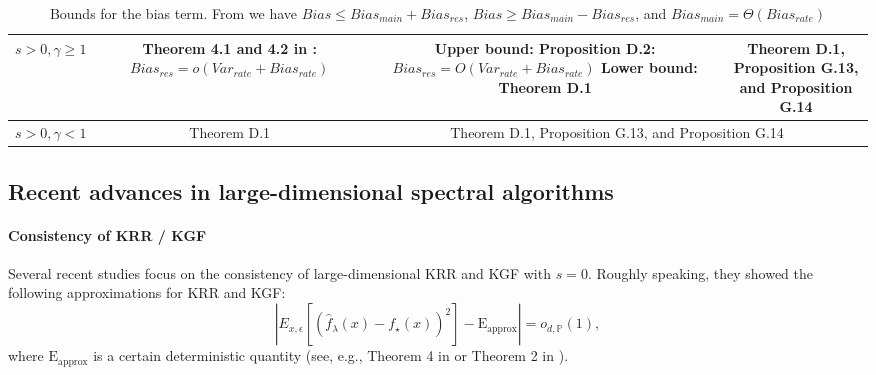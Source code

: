 \documentclass{article}
\theoremstyle{plain}
\theoremstyle{definition}
\theoremstyle{remark}
\begin{document}
\begin{appendix}
\begin{table}[h!]
\begin{tabular}{|c|c|c|c|}
$s>0, \gamma \geq 1$ 
& \makecell{Theorem 4.1 and 4.2 in \cite{lu2024saturation}:\\
$Bias_{res}=o(Var_{rate} + Bias_{rate})$}
& \makecell{{\color{red} Upper bound: Proposition D.2:} \\
$Bias_{res}=O(Var_{rate} + Bias_{rate})$\\
Lower bound: Theorem D.1}
& \makecell{Theorem D.1, Proposition G.13,\\ 
and Proposition G.14} \\
\hline

$s>0, \gamma < 1$
& Theorem D.1 
& \multicolumn{2}{c|}{Theorem D.1, Proposition G.13, and Proposition G.14} \\
\hline
\end{tabular}
\caption{Bounds for the bias term. From \cite{lu2024saturation} we have $Bias \leq Bias_{main} + Bias_{res}$, $Bias \geq Bias_{main} - Bias_{res}$, and $Bias_{main}=\Theta(Bias_{rate})$}
\end{table}
\fi

\subsection{Recent advances in large-dimensional spectral algorithms}\label{subsec_related_work_large_dimension_spe}

\paragraph*{Consistency of KRR / KGF}


Several recent studies \citep{ghorbani2021linearized, Donhauser_how_2021, mei2022generalization, xiao2022precise, misiakiewicz_spectrum_2022, hu2022sharp} focus on the consistency of large-dimensional KRR and KGF with $s=0$. Roughly speaking, they showed the following approximations for KRR and KGF:
\begin{equation}\label{eqn_restate_thm_4_in_linear}
    \left|E_{x, \epsilon} \left[ \left(\hat{f}_{\lambda}(x) - f_{\star}(x) \right)^{2} \right]-
    \text{E}_{\text{approx}}
    \right| =o_{d, \mathbb{P}}\left(1\right),
\end{equation}
where $\text{E}_{\text{approx}}$ is a certain deterministic quantity (see, e.g., Theorem 4 in \cite{ghorbani2021linearized} or Theorem 2 in \cite{xiao2022precise}).




\end{appendix}
\end{document}
